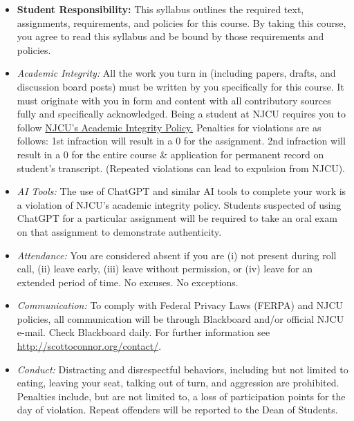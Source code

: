 \documentclass[article,oneside]{memoir}
\begin{document}
\begin{itemize}

\item \textbf{Student Responsibility:} This syllabus outlines the required text, assignments, requirements, and policies for this course. By taking this course, you agree to read this syllabus and be bound by those requirements and policies. 

 \item \textit{Academic Integrity:} All the work you turn in (including papers, drafts, and discussion board posts) must be written by you specifically for this course. It must originate with you in form and content with all contributory sources fully and specifically acknowledged. Being a student at NJCU requires you to follow \href{http://scottoconnor.org/resources/Plagiarism.pdf}{NJCU's Academic Integrity Policy.} Penalties for violations are as follows: 1st infraction will result in a 0 for the assignment.  2nd infraction will result in a 0 for the entire course \& application for permanent record on student's transcript. (Repeated violations can lead to expulsion from NJCU). 

\item \textit{AI Tools:} The use of ChatGPT and similar AI tools to complete your work is a violation of NJCU's academic integrity policy. Students suspected of using ChatGPT for a particular assignment will be required to take an oral exam on that assignment to demonstrate authenticity. 

\item \textit{Attendance:} You are considered absent if you are (i) not present during roll call, (ii) leave early, (iii) leave without permission, or (iv) leave for an extended period of time. No excuses. No exceptions.



\item \textit{Communication:} To comply with Federal Privacy Laws (FERPA) and NJCU policies, all communication will be through Blackboard and/or official NJCU e-mail. Check Blackboard daily. For further information see \href{http://scottoconnor.org/contact/}{http://scottoconnor.org/contact/}.

\item \textit{Conduct:} Distracting and disrespectful behaviors, including but not limited to eating, leaving your seat, talking out of turn, and aggression are prohibited. Penalties include, but are not limited to, a loss of participation points for the day of violation. Repeat offenders will be reported to the Dean of Students. 


\end{itemize}
\end{document}
